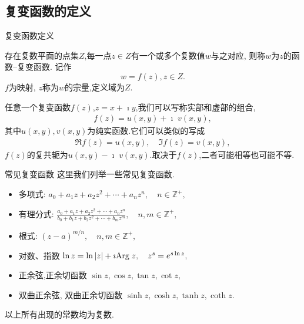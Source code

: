 \documentclass[fontset=windows, chinese, 10pt]{beamer}
\begin{document}
  \subsection{复变函数的定义}
  \begin{frame}{复变函数定义}
    \begin{definition}
      存在复数平面的点集$Z$,每一点$z\in Z$有一个或多个复数值$w$与之对应, 则称$w$为$z$的函数--复变函数. 记作
      \begin{equation}
          w = f(z), z\in Z .
      \end{equation}
      $f$为映射, $z$称为$w$的宗量,定义域为$Z$. 
    \end{definition}

任意一个复变函数$f(z)$,$z=x + \imath y$,我们可以写称实部和虚部的组合,
\begin{align}
    f(z) = u(x,y) +\imath \; v(x,y) ,
\end{align}
其中$u(x,y), v(x,y)$为纯实函数.它们可以类似的写成
\begin{align}
    \Re f(z) = u(x,y), \quad \Im f(z) = v(x,y) ,
\end{align}
$f(z)$的复共轭为$u(x,y) - \imath \; v(x,y)$.取决于$f(z)$,二者可能相等也可能不等.

  \end{frame}

  \begin{frame}{常见复变函数}
    这里我们列举一些常见复变函数.

\begin{itemize}
    \item 多项式:
        $
            a_0 + a_1 z + a_2 z^2 + \cdots + a_n z^n , \quad n\in \mathbb{Z}^+ ,
       $
    \item 有理分式:       
         $
        \frac{a_0 + a_1 z + a_2 z^2 + \cdots + a_n z^n}{{b_0 + b_1 z + b_2 z^2 + \cdots + b_m z^m}} , \quad  n,m\in \mathbb{Z}^+ ,
       $
    \item 根式:
        $
            (z-a)^{m/n} , \quad  n,m\in \mathbb{Z}^+ ,
       $
    \item 对数、指数
        $
            \ln z = \ln |z| + \imath {\mathrm{Arg}\;} z, \quad z^s = e^{s\ln z} ,
       $
    \item 正余弦,正余切函数 
        $
            \sin z , \cos z , \tan z, \cot z ,
       $
    \item 双曲正余弦, 双曲正余切函数
        $
            \sinh z , \cosh z , \tanh z, \coth z  .
       $
\end{itemize}
以上所有出现的常数均为复数.

\end{frame}
\end{document}
